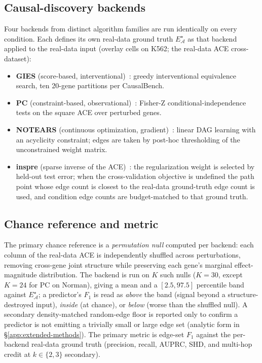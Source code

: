 \documentclass{article}
\theoremstyle{plain}
\theoremstyle{definition}
\theoremstyle{remark}
\begin{document}
\subsection{Causal-discovery backends}
Four backends from distinct algorithm families are run identically on every condition. Each defines its own real-data ground truth $E^{\star}_{\mathcal{A}}$ as that backend applied to the real-data input (overlay cells on K562; the real-data ACE cross-dataset):
\begin{itemize}
\item \textbf{GIES} (score-based, interventional)~\citep{hauser2012gies}: greedy interventional equivalence search, ten 20-gene partitions per CausalBench.
\item \textbf{PC} (constraint-based, observational)~\citep{spirtes2000}: Fisher-Z conditional-independence tests on the square ACE over perturbed genes.
\item \textbf{NOTEARS} (continuous optimization, gradient)~\citep{zheng2018notears}: linear DAG learning with an acyclicity constraint; edges are taken by post-hoc thresholding of the unconstrained weight matrix.
\item \textbf{inspre} (sparse inverse of the ACE)~\citep{brown2025inspre}: the regularization weight is selected by held-out test error; when the cross-validation objective is undefined the path point whose edge count is closest to the real-data ground-truth edge count is used, and condition edge counts are budget-matched to that ground truth.
\end{itemize}

\subsection{Chance reference and metric}
\label{sec:chance}
The primary chance reference is a \emph{permutation null} computed per backend: each column of the real-data ACE is independently shuffled across perturbations, removing cross-gene joint structure while preserving each gene's marginal effect-magnitude distribution. The backend is run on $K$ such nulls ($K=30$, except $K=24$ for PC on Norman), giving a mean and a $[2.5,97.5]$ percentile band against $E^{\star}_{\mathcal{A}}$; a predictor's $F_1$ is read as \emph{above} the band (signal beyond a structure-destroyed input), \emph{inside} (at chance), or \emph{below} (worse than the shuffled null). A secondary density-matched random-edge floor is reported only to confirm a predictor is not emitting a trivially small or large edge set (analytic form in \S\ref{app:extended-methods}). The primary metric is edge-set $F_1$ against the per-backend real-data ground truth (precision, recall, AUPRC, SHD, and multi-hop credit at $k\in\{2,3\}$ secondary).
\end{document}
